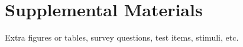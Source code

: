 \section{Supplemental Materials}
\label{app:C}

\MAEindent

Extra figures or tables, survey questions, test items, stimuli, etc.